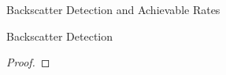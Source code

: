 \documentclass[journal]{IEEEtran}
\begin{document}
\begin{section}{Backscatter Detection and Achievable Rates}
\begin{subsection}{Backscatter Detection}
\begin{proof}






			\end{proof}


\end{subsection}
\end{section}
\end{document}
